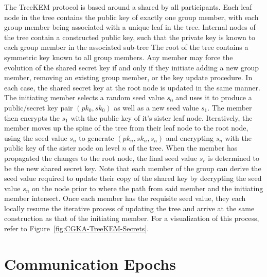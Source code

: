 The TreeKEM protocol is based around a  \autocite{baerentzen2003left} shared by all participants.
Each leaf node in the tree contains the public key \autocite{rfc4949} of exactly one group member, with each group member being associated with a unique leaf in the tree.
Internal nodes of the tree contain a constructed public key, such that the private key is known to each group member in the associated sub-tree
The root of the tree contains a symmetric key \autocite{rfc4949} known to all group members.
Any member may force the evolution of the shared secret key if and only if they initiate adding a new group member, removing an existing group member, or the key update procedure.
In each case, the shared secret key at the root node is updated in the same manner.
The initiating member selects a random seed \autocite{rfc4949} value \(s_0\) and uses it to produce a public/secret key pair \((pk_0,sk_0)\) as well as a new seed value \(s_1\).
The member then encrypts the \(s_1\) with the public key of it's sister leaf node.
Iteratively, the member moves up the spine of the tree from their leaf node to the root node, using the seed value \(s_n\) to generate \((pk_n,sk_n,s_n)\) and encrypting \(s_n\) with the public key of the sister node on level \(n\) of the tree.
When the member has propagated the changes to the root node, the final seed value \(s_r\) is determined to be the new shared secret key.
Note that each member of the group can derive the seed value required to update their copy of the shared key by decrypting the seed value \(s_n\) on the node prior to where the path from said member and the initiating member intersect.
Once each member has the requisite seed value, they each locally resume the iterative process of updating the tree and arrive at the same construction as that of the initiating member.
For a visualization of this process, refer to Figure\ \ref{fig:CGKA-TreeKEM-Secrets}.


\hypertarget{sec:communication-epochs}{%
\section{Communication Epochs}\label{sec:communication-epochs}}

